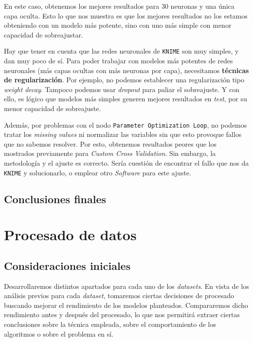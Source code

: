 \documentclass[11pt]{article}
\begin{document}
En este caso, obtenemos los mejores resultados para 30 neuronas y una única capa oculta. Esto lo que nos muestra es que los mejores resultados no los estamos obteniendo con un modelo más potente, sino con uno más simple con menor capacidad de sobreajustar.

Hay que tener en cuenta que las redes neuronales de \lstinline{KNIME} son muy simples, y dan muy poco de sí. Para poder trabajar con modelos más potentes de redes neuronales (más capas ocultas con más neuronas por capa), necesitamos \textbf{técnicas de regularización}. Por ejemplo, no podemos establecer una regularización tipo \emph{weight decay}. Tampoco podemos usar \emph{dropout} para paliar el sobreajuste. Y con ello, es lógico que modelos más simples generen mejores resultados en \emph{test}, por su menor capacidad de sobreajuste.

Además, por problemas con el nodo \lstinline{Parameter Optimization Loop}, no podemos tratar los \emph{missing values} ni normalizar las variables sin que esto provoque fallos que no sabemos resolver. Por esto, obtenemos resultados peores que los mostrados previamente para \emph{Custom Cross Validation}. Sin embargo, la metodología y el ajuste es correcto. Sería cuestión de encontrar el fallo que nos da \lstinline{KNIME} y solucionarlo, o emplear otro \emph{Software} para este ajuste.

\pagebreak

\subsection{Conclusiones finales}


\pagebreak

\section{Procesado de datos}

\subsection{Consideraciones iniciales}

Desarrollaremos distintos apartados para cada uno de los \emph{datasets}. En vista de los análisis previos para cada \emph{dataset}, tomaremos ciertas decisiones de procesado buscando mejorar el rendimiento de los modelos planteados. Compararemos dicho rendimiento antes y después del procesado, lo que nos permitirá extraer ciertas conclusiones sobre la técnica empleada, sobre el comportamiento de los algoritmos o sobre el problema en sí.
\end{document}
